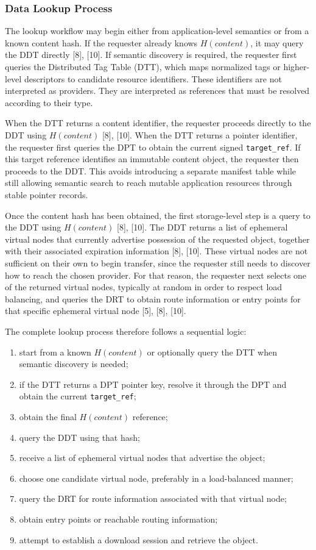 \documentclass[12pt,a4paper]{article}
\begin{document}
\subsubsection{Data Lookup Process}

The lookup workflow may begin either from application-level semantics or from a known content hash. If the requester already knows \(H(content)\), it may query the DDT directly [8], [10]. If semantic discovery is required, the requester first queries the Distributed Tag Table (DTT), which maps normalized tags or higher-level descriptors to candidate resource identifiers. These identifiers are not interpreted as providers. They are interpreted as references that must be resolved according to their type.

When the DTT returns a content identifier, the requester proceeds directly to the DDT using \(H(content)\) [8], [10]. When the DTT returns a pointer identifier, the requester first queries the DPT to obtain the current signed \texttt{target\_ref}. If this target reference identifies an immutable content object, the requester then proceeds to the DDT. This avoids introducing a separate manifest table while still allowing semantic search to reach mutable application resources through stable pointer records.

Once the content hash has been obtained, the first storage-level step is a query to the DDT using \(H(content)\) [8], [10]. The DDT returns a list of ephemeral virtual nodes that currently advertise possession of the requested object, together with their associated expiration information [8], [10]. These virtual nodes are not sufficient on their own to begin transfer, since the requester still needs to discover how to reach the chosen provider. For that reason, the requester next selects one of the returned virtual nodes, typically at random in order to respect load balancing, and queries the DRT to obtain route information or entry points for that specific ephemeral virtual node [5], [8], [10].

The complete lookup process therefore follows a sequential logic:
\begin{enumerate}
    \item start from a known \(H(content)\) or optionally query the DTT when semantic discovery is needed;
    \item if the DTT returns a DPT pointer key, resolve it through the DPT and obtain the current \texttt{target\_ref};
    \item obtain the final \(H(content)\) reference;
    \item query the DDT using that hash;
    \item receive a list of ephemeral virtual nodes that advertise the object;
    \item choose one candidate virtual node, preferably in a load-balanced manner;
    \item query the DRT for route information associated with that virtual node;
    \item obtain entry points or reachable routing information;
    \item attempt to establish a download session and retrieve the object.
\end{enumerate}
\end{document}
